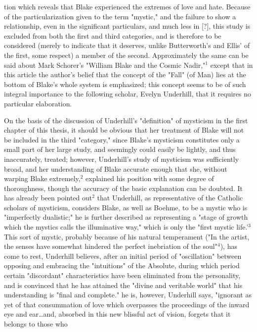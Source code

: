 \noindent tion which reveals that Blake experienced the extremes of love and hate. Because of the particularization given to the term "mystic," and the failure to show a relationship,
even in the significant particulars, and much less in [?], this study is excluded from both the first
and third categories, and is therefore to be considered (merely to indicate that it deserves, unlike Butterworth's and Ellis' of
the first, some respect) a member of the second. Approximately the same can be said about Mark Schorer's "William Blake and
the Cosmic Nadir,"$^{1}$ except that in this article the author's belief that the concept of the "Fall" (of Man) lies
at the bottom of Blake's whole system is emphasized; this concept seems to be of such integral importance to the following
scholar, Evelyn Underhill, that it requires no particular elaboration.\par
\vspace*{0.5\baselineskip}
On the basis of the discussion of Underhill's "definition" of
mysticism in the first chapter of this thesis, it should
be obvious that her treatment of Blake will not be included in the
third "category," since Blake's mysticism constitutes only a small part of her large study, and
seemingly could easily be lightly, and thus inaccurately, treated; however, Underhill's study of
mysticism was sufficiently broad, and her understanding of Blake accurate enough that she, without
warping Blake extremely,$^{2}$ explained his position with some degree of thoroughness, though
the accuracy of the basic explanation can be doubted. It has already been
pointed out$^{2}$ that Underhill, as representative of the Catholic
scholars of mysticism, considers Blake, as well as Boehme, to be a mystic
who is "imperfectly dualistic;" he is further described as representing a "stage of growth
which the mystics calls the illuminative way," which is only the "first mystic life.'$^{3}$ This sort of
mystic, probably because of his natural temperament ("In the artist, the senses have somewhat
hindered the perfect inebriation of the soul"$^{4}$), has come to rest, Underhill believes, after an
initial period of "oscillation" between opposing and embracing the "intuitions" of the Absolute, during which
period certain "discordant" characteristics have been eliminated from the personality, and is convinced that he has
attained the "divine and veritable world" that his understanding is "final and complete." he is, however, Underhill
says, "ignorant as yet of that consummation of love which overpasses the proceedings of the inward eye and
ear\dots and, absorbed in this new blissful act of vision, forgets that it belongs to those who
